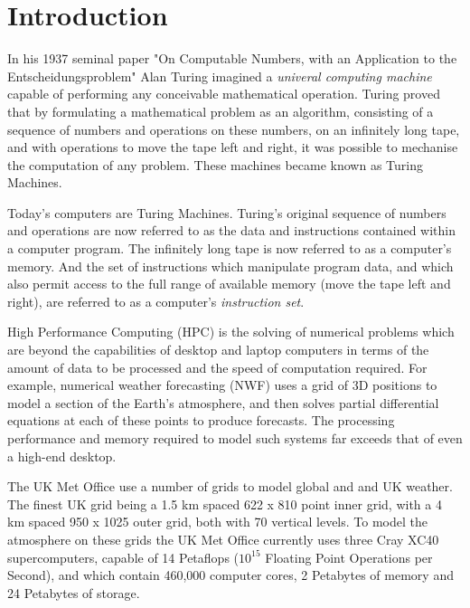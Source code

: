 \section{Introduction}

In his 1937 seminal paper "On Computable Numbers, with an Application to the Entscheidungsproblem" Alan Turing imagined a \emph{univeral computing machine} capable of performing any conceivable mathematical operation. Turing proved that by formulating a mathematical problem as an algorithm, consisting of a sequence of numbers and operations on these numbers, on an infinitely long tape, and with operations to move the tape left and right, it was possible to mechanise the computation of any problem. These machines became known as Turing Machines. 

Today's computers are Turing Machines. Turing's original sequence of numbers and operations are now referred to as the data and  instructions contained within a computer program. The infinitely long tape is now referred to as a computer's memory. And the set of instructions which manipulate program data, and which also permit access to the full range of available memory (move the tape left and right), are referred to as a computer's \emph{instruction set}.

High Performance Computing (HPC) is the solving of numerical problems which are beyond the capabilities of desktop and laptop computers in terms of the amount of data to be processed and the speed of computation required. For example, numerical weather forecasting (NWF) uses a grid of 3D positions to model a section of the Earth's atmosphere, and then solves partial differential equations at each of these points to produce forecasts. The processing performance and memory required to model such systems far exceeds that of even a high-end desktop. 

The UK Met Office use a number of grids to model global and and UK weather. The finest UK grid being a 1.5 km spaced 622 x 810 point inner grid, with a 4 km spaced 950 x 1025 outer grid, both with 70 vertical levels. To model the atmosphere on these grids the UK Met Office currently uses three Cray XC40 supercomputers, capable of 14 Petaflops ($10^{15}$ Floating Point Operations per Second), and which contain 460,000 computer cores, 2 Petabytes of memory and 24 Petabytes of storage.

